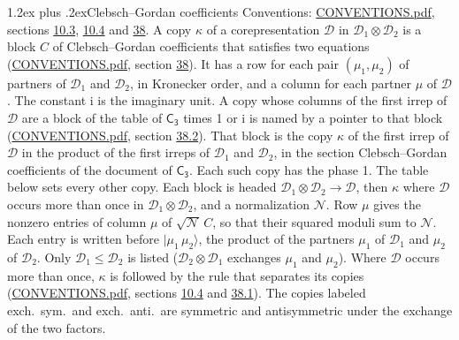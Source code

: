 \documentclass[10pt,a4paper]{article}
\makeatletter
\renewcommand\section{\@startsection{section}{1}{\z@}{-3ex plus -1ex minus -.2ex}%
  {1.2ex plus .2ex}{\normalfont\large\sffamily\bfseries\color{parttitle}}}
\numberwithin{equation}{section}
\newcommand{\grp}[1]{\mathsf{#1}}
\newcommand{\iunit}{\mathrm{i}}
\newcommand{\irrprod}{\otimes}
\newcommand{\mult}{\kappa}
\newcommand{\intx}{\mu}
\newcommand{\cgnorm}{\mathcal{N}}
\newcommand{\prodket}[2]{\lvert {#1}\,{#2}\rangle}
\makeatother
\begin{document}
\section{Clebsch--Gordan coefficients}\label{s:clebsch_gordan}
Conventions: \href{../../CONVENTIONS.pdf}{CONVENTIONS.pdf}, sections \href{../../../rotation/CONVENTIONS.pdf\#conv.10.3}{10.3}, \href{../../../rotation/CONVENTIONS.pdf\#conv.10.4}{10.4} and \href{../../CONVENTIONS.pdf\#conv.38}{38}.
\leavevmode\label{n:index.copy}\label{n:matrix.cg.stored}A copy $\mult$ of a corepresentation $\mathcal{D}$ in $\mathcal{D}_1\irrprod\mathcal{D}_2$ is a block $C$ of Clebsch--Gordan coefficients that satisfies two equations (\href{../../CONVENTIONS.pdf}{CONVENTIONS.pdf}, section \href{../../CONVENTIONS.pdf\#conv.38}{38}). \label{n:index.cg}It has a row for each pair $(\intx_1, \intx_2)$ of partners of $\mathcal{D}_1$ and $\mathcal{D}_2$, in Kronecker order, and a column for each partner $\intx$ of $\mathcal{D}$.
The constant $\iunit$ is the imaginary unit.
A copy whose columns of the first irrep of $\mathcal{D}$ are a block of the table of $\grp{C_{3}}$ times 1 or $\iunit$ is named by a pointer to that block (\href{../../CONVENTIONS.pdf}{CONVENTIONS.pdf}, section \href{../../CONVENTIONS.pdf\#conv.38.2}{38.2}). That block is the copy $\mult$ of the first irrep of $\mathcal{D}$ in the product of the first irreps of $\mathcal{D}_1$ and $\mathcal{D}_2$, in the section Clebsch--Gordan coefficients of the document of \href{../../../rotation/data/pdf/C3.pdf}{$\grp{C_{3}}$}. Each such copy has the phase 1. The table below sets every other copy.
Each block is headed $\mathcal{D}_1\irrprod\mathcal{D}_2\to\mathcal{D}$, then $\mult$ where $\mathcal{D}$ occurs more than once in $\mathcal{D}_1\irrprod\mathcal{D}_2$, and a normalization $\cgnorm$. Row $\intx$ gives the nonzero entries of column $\intx$ of $\sqrt{\cgnorm}\,C$, so that their squared moduli sum to $\cgnorm$. \label{n:vector.ket.product}Each entry is written before $\prodket{\intx_1}{\intx_2}$, the product of the partners $\intx_1$ of $\mathcal{D}_1$ and $\intx_2$ of $\mathcal{D}_2$. Only $\mathcal{D}_1 \le \mathcal{D}_2$ is listed ($\mathcal{D}_2\irrprod\mathcal{D}_1$ exchanges $\intx_1$ and $\intx_2$).
Where $\mathcal{D}$ occurs more than once, $\mult$ is followed by the rule that separates its copies (\href{../../CONVENTIONS.pdf}{CONVENTIONS.pdf}, sections \href{../../../rotation/CONVENTIONS.pdf\#conv.10.4}{10.4} and \href{../../CONVENTIONS.pdf\#conv.38.1}{38.1}). \label{n:abbreviation.exchange}The copies labeled exch.\ sym.\ and exch.\ anti.\ are symmetric and antisymmetric under the exchange of the two factors.
\end{document}
